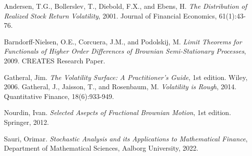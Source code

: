 \documentclass[11pt,a4paper,twoside,openright,english]{book}
\begin{document}
\frontmatter





\mainmatter

%




%




% 
% 

%

\backmatter


%
%
\begin{thebibliography}{}
Andersen, T.G., Bollerslev, T., Diebold, F.X., and Ebens, H. \textit{The Distribution of Realized Stock Return Volatility}, 2001. Journal of Financial Economics, 61(1):43-76.

Barndorff-Nielsen, O.E., Corcuera, J.M., and Podolskij, M. \textit{Limit Theorems for Functionals of Higher Order Differences of Brownian Semi-Stationary Processes}, 2009. CREATES Research Paper.

Gatheral, Jim. \textit{The Volatility Surface: A Practitioner's Guide}, 1st edition. Wiley, 2006.
Gatheral, J., Jaisson, T., and Rosenbaum, M. \textit{Volatility is Rough}, 2014. Quantitative Finance, 18(6):933-949.

Nourdin, Ivan. \textit{Selected Asepcts of Fractional Brownian Motion}, 1st edition. Springer, 2012.

Sauri, Orimar. \textit{Stochastic Analysis and its Applications to Mathematical Finance}, Department of Mathematical Sciences, Aalborg University, 2022.
\end{thebibliography}{}
\end{document}
